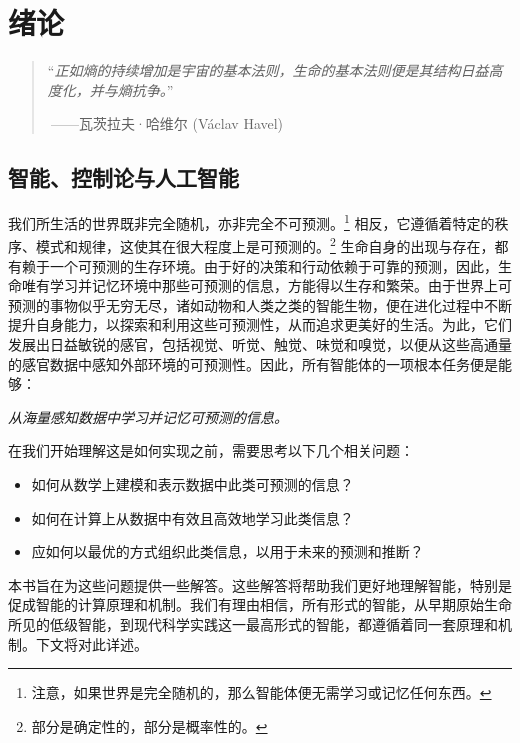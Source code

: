 \documentclass[../../book-main.tex]{subfiles}
\begin{document}
\chapter{绪论}
\label{ch:intro}

\begin{quote}
“{\em 正如熵的持续增加是宇宙的基本法则，生命的基本法则便是其结构日益高度化，并与熵抗争。}”

$~$\hfill ——瓦茨拉夫·哈维尔 (V\'{a}clav Havel)
 \end{quote}
\vspace{5mm}



\section{智能、控制论与人工智能}
我们所生活的世界既非完全随机，亦非完全不可预测。\footnote{注意，如果世界是完全随机的，那么智能体便无需学习或记忆任何东西。} 相反，它遵循着特定的秩序、模式和规律，这使其在很大程度上是可预测的。\footnote{部分是确定性的，部分是概率性的。} 生命自身的出现与存在，都有赖于一个可预测的生存环境。由于好的决策和行动依赖于可靠的预测，因此，生命唯有学习并记忆环境中那些可预测的信息，方能得以生存和繁荣。由于世界上可预测的事物似乎无穷无尽，诸如动物和人类之类的智能生物，便在进化过程中不断提升自身能力，以探索和利用这些可预测性，从而追求更美好的生活。为此，它们发展出日益敏锐的感官，包括视觉、听觉、触觉、味觉和嗅觉，以便从这些高通量的感官数据中感知外部环境的可预测性。因此，所有智能体的一项根本任务便是能够：
\begin{center}
    {\em 从海量感知数据中学习并记忆可预测的信息。}
\end{center}
在我们开始理解这是如何实现之前，需要思考以下几个相关问题：
\begin{itemize}
    \item 如何从数学上建模和表示数据中此类可预测的信息？
    \item 如何在计算上从数据中有效且高效地学习此类信息？
    \item 应如何以最优的方式组织此类信息，以用于未来的预测和推断？
\end{itemize}
本书旨在为这些问题提供一些解答。这些解答将帮助我们更好地理解智能，特别是促成智能的计算原理和机制。我们有理由相信，所有形式的智能，从早期原始生命所见的低级智能，到现代科学实践这一最高形式的智能，都遵循着同一套原理和机制。下文将对此详述。
\end{document}
